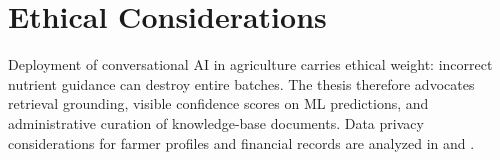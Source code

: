 \section{Ethical Considerations}
\label{sec:ethics}

Deployment of conversational AI in agriculture carries ethical weight: incorrect nutrient guidance can destroy entire batches. The thesis therefore advocates retrieval grounding, visible confidence scores on ML predictions, and administrative curation of knowledge-base documents. Data privacy considerations for farmer profiles and financial records are analyzed in  and .
